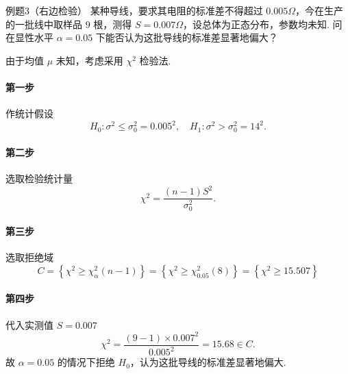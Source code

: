 \begin{question}{例题3（右边检验）}
    某种导线，要求其电阻的标准差不得超过 $0.005\Omega$，今在生产的一批线中取样品 9 根，测得 $S=0.007\Omega$，设总体为正态分布，参数均未知. 问在显性水平 $\alpha=0.05$ 下能否认为这批导线的标准差显著地偏大？
\end{question}
\begin{solution}
    由于均值 $\mu$ 未知，考虑采用 $\chi^2$ 检验法.
    \paragraph{第一步} 作统计假设
    $$
        H_0: \sigma^2 \leqslant \sigma_0^2 = 0.005^2, \quad H_1: \sigma^2 > \sigma_0^2 = 14^2.
    $$
    \paragraph{第二步} 选取检验统计量
    $$
        \chi^2 = \frac{(n-1)S^2}{\sigma_0^2}.
    $$
    \paragraph{第三步} 选取拒绝域
    $$
        C = \left\{\chi^2 \geqslant \chi_{\alpha}^2(n-1)\right\}
        = \left\{\chi^2 \geqslant \chi_{0.05}^2(8)\right\}
        = \left\{\chi^2 \geqslant 15.507\right\}
    $$
    \paragraph{第四步} 代入实测值 $S=0.007$
    $$
        \chi^2 = \frac{(9-1) \times 0.007^2}{0.005^2} = 15.68 \in C.
    $$
    故 $\alpha = 0.05$ 的情况下拒绝 $H_0$，认为这批导线的标准差显著地偏大.
\end{solution}